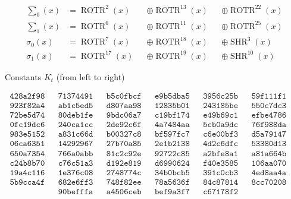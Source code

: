 \begin{enumerate}
	\begin{equation}
	\label{eq:shaFn2}
	\begin{aligned}
		\sum\nolimits_{0}(x) &=\operatorname{ROTR}^{2}(x) &&\oplus \operatorname{ROTR}^{13}(x) &&\oplus \operatorname{ROTR}^{22}(x) \\
		\sum\nolimits_{1}(x) &= \operatorname{ROTR}^{6}(x) &&\oplus \operatorname{ROTR}^{11}(x) &&\oplus \operatorname{ROTR}^{25}(x) \\
		\sigma_{0}(x) &= \operatorname{ROTR}^{7}(x) &&\oplus \operatorname{ROTR}^{18}(x) &&\oplus \operatorname{SHR}^{3}(x) \\
		\sigma_{1}(x) &= \operatorname{ROTR}^{17}(x) &&\oplus \operatorname{ROTR}^{19}(x) &&\oplus \operatorname{SHR}^{10}(x)
    \end{aligned}
	\end{equation}
	
	Constants $K_t$ (from left to right) 

	\begin{equation}
	\label{eq:shaConst}
	\begin{aligned}
		\texttt{428a2f98} && \texttt{71374491} && \texttt{b5c0fbcf} && \texttt{e9b5dba5} && \texttt{3956c25b} && \texttt{59f111f1} \\
		\texttt{923f82a4} && \texttt{ab1c5ed5} && \texttt{d807aa98} && \texttt{12835b01} && \texttt{243185be} && \texttt{550c7dc3} \\
	    \texttt{72be5d74} && \texttt{80deb1fe} && \texttt{9bdc06a7} && \texttt{c19bf174} && \texttt{e49b69c1} && \texttt{efbe4786} \\
		\texttt{0fc19dc6} && \texttt{240ca1cc} && \texttt{2de92c6f} && \texttt{4a7484aa} && \texttt{5cb0a9dc} && \texttt{76f988da} \\
		\texttt{983e5152} && \texttt{a831c66d} && \texttt{b00327c8} && \texttt{bf597fc7} && \texttt{c6e00bf3} && \texttt{d5a79147} \\ 
		\texttt{06ca6351} && \texttt{14292967} && \texttt{27b70a85} && \texttt{2e1b2138} && \texttt{4d2c6dfc} && \texttt{53380d13} \\
		\texttt{650a7354} && \texttt{766a0abb} && \texttt{81c2c92e} && \texttt{92722c85} && \texttt{a2bfe8a1} && \texttt{a81a664b} \\
		\texttt{c24b8b70} && \texttt{c76c51a3} && \texttt{d192e819} && \texttt{d6990624} && \texttt{f40e3585} && \texttt{106aa070} \\
		\texttt{19a4c116} && \texttt{1e376c08} && \texttt{2748774c} && \texttt{34b0bcb5} && \texttt{391c0cb3} && \texttt{4ed8aa4a} \\
		\texttt{5b9cca4f} && \texttt{682e6ff3} && \texttt{748f82ee} && \texttt{78a5636f} && \texttt{84c87814} && \texttt{8cc70208} \\
						  && \texttt{90befffa} && \texttt{a4506ceb} && \texttt{bef9a3f7} &&\texttt{c67178f2}&&&&
	\end{aligned}
	\end{equation}


\end{enumerate}
